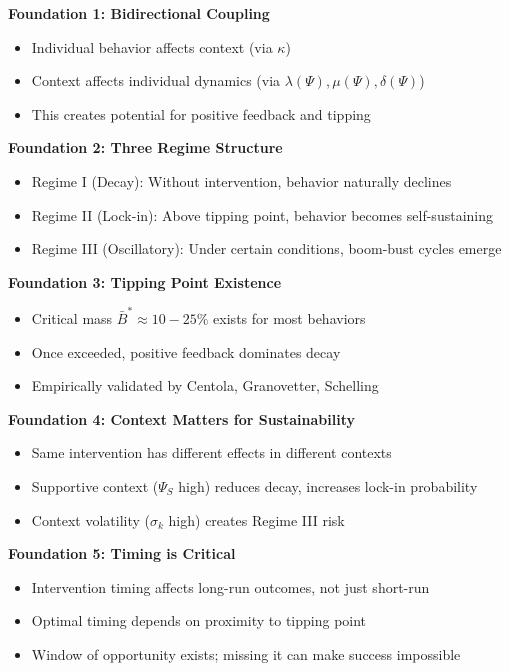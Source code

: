 \begin{tcolorbox}[colback=yellow!5!white,colframe=yellow!75!black,title=Critical Foundations: UNTCM]

\textbf{Foundation 1: Bidirectional Coupling}
\begin{itemize}[nosep]
    \item Individual behavior affects context (via $\kappa$)
    \item Context affects individual dynamics (via $\lambda(\Psi), \mu(\Psi), \delta(\Psi)$)
    \item This creates potential for positive feedback and tipping
\end{itemize}

\textbf{Foundation 2: Three Regime Structure}
\begin{itemize}[nosep]
    \item Regime I (Decay): Without intervention, behavior naturally declines
    \item Regime II (Lock-in): Above tipping point, behavior becomes self-sustaining
    \item Regime III (Oscillatory): Under certain conditions, boom-bust cycles emerge
\end{itemize}

\textbf{Foundation 3: Tipping Point Existence}
\begin{itemize}[nosep]
    \item Critical mass $\bar{B}^* \approx 10-25\%$ exists for most behaviors
    \item Once exceeded, positive feedback dominates decay
    \item Empirically validated by Centola, Granovetter, Schelling
\end{itemize}

\textbf{Foundation 4: Context Matters for Sustainability}
\begin{itemize}[nosep]
    \item Same intervention has different effects in different contexts
    \item Supportive context ($\Psi_S$ high) reduces decay, increases lock-in probability
    \item Context volatility ($\sigma_k$ high) creates Regime III risk
\end{itemize}

\textbf{Foundation 5: Timing is Critical}
\begin{itemize}[nosep]
    \item Intervention timing affects long-run outcomes, not just short-run
    \item Optimal timing depends on proximity to tipping point
    \item Window of opportunity exists; missing it can make success impossible
\end{itemize}

\end{tcolorbox}

